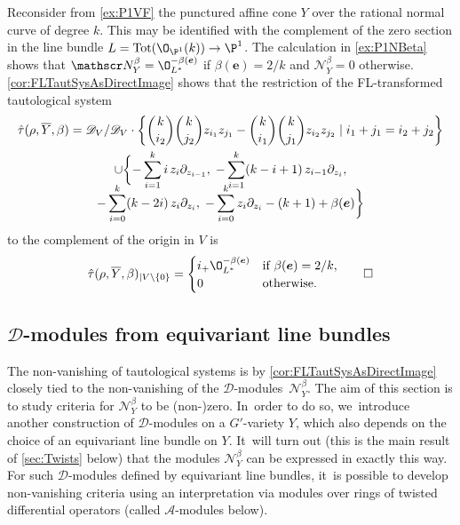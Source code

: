 \documentclass[JEP,XML,SOM,Unicode,published]{cedram}
\newcommand{\bme}{{\boldsymbol{e}}}
\newcommand{\cA}{\mathscr{A}}
\newcommand{\cD}{\mathscr{D}}
\DeclareMathOperator{\Tot}{Tot}
\let\originalleft\left
\let\originalright\right
\renewcommand{\left}{\mathopen{}\mathclose\bgroup\originalleft}
\renewcommand{\right}{\aftergroup\egroup\originalright}
\newcommand\restr[2]{{#1_{| {#2}}}}
\begin{document}
\begin{exa}
Reconsider from \cref{ex:P1VF} the punctured affine cone $Y$ over the rational normal curve of degree $k$. This may be identified with the complement of the zero section in the line bundle $L = \Tot(\O_{\P^1}(k)) \to \P^1$. The calculation in \cref{ex:P1NBeta} shows that $\mathscr N_Y^\beta = \O_{L^*}^{-\beta(\bme)}$ if $\beta(\bme) = 2/k$ and $\mathscr N_Y^\beta = 0$ otherwise. \cref{cor:FLTautSysAsDirectImage} shows that the restriction of the FL-transformed tautological system
\begin{multline*}
\hat \tau(\rho,\overline Y, \beta) = \mathscr D_V / \mathscr D_V \cdot \left\{\binom{k}{i_2} \binom{k}{j_2} z_{i_1} z_{j_1}- \binom{k}{i_1} \binom{k}{j_1} z_{i_2} z_{j_2} \mid i_1+j_1=i_2+j_2\right\} \\
\cup \biggl\{-\sum_{i=1}^k i \, z_i \partial_{z_{i-1}}, \; -\sum_{i=1}^k (k-i+1) \, z_{i-1} \partial_{z_i},\\[-8pt]
 -\sum_{i=0}^k (k-2i) \, z_i \partial_{z_i}, \; -\sum_{i=0}^k z_i \partial_{z_i}-(k+1)+\beta(\bme)\biggr\}
\end{multline*}
to the complement of the origin in $V$ is
\[
\restr{\hat \tau(\rho,\overline Y,\beta)}{V\setminus \{0\}} =
\begin{cases}
i_+ \O_{L^*}^{-\beta(\bme)} &\text{if } \beta(\bme) = 2/k, \\
0 &\text{otherwise}.
\end{cases}\qedhere
\]
\end{exa}

\subsection{\texorpdfstring{$\cD$}{D}-modules from equivariant line bundles} \label{ssec:DFromAMod}

The non-vanishing of tautological systems is by \cref{cor:FLTautSysAsDirectImage} closely tied to the non-vanishing of the $\mathscr{D}$\nobreakdash-mod\-ules~$\mathscr{N}_Y^\beta$. The aim of this section is to study criteria for $\mathscr N_Y^\beta$ to be (non-)zero. In~order to do so, we~introduce another construction of $\cD$\nobreakdash-mod\-ules on a $G'$-variety $Y$, which also depends on the choice of an equivariant line bundle on $Y$. It~will turn out (this is the main result of \cref{sec:Twists} below) that the modules $\mathscr N_Y^\beta$ can be expressed in exactly this way.
For such $\cD$\nobreakdash-mod\-ules defined by equivariant line bundles, it~is possible to develop non-vanishing criteria using an interpretation via modules over rings of twisted differential operators (called $\cA$\nobreakdash-mod\-ules below).
\end{document}
